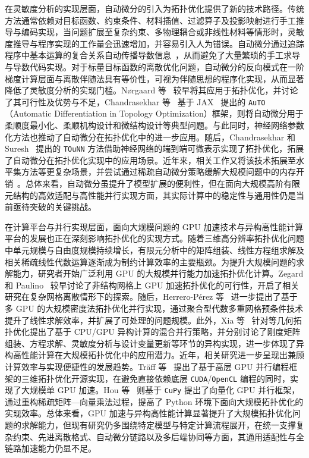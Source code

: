 在灵敏度分析的实现层面，自动微分的引入为拓扑优化提供了新的技术路径。传统方法通常依赖对目标函数、约束条件、材料插值、过滤算子及投影映射进行手工推导与编码实现，当问题扩展至复杂约束、多物理耦合或非线性材料等情形时，灵敏度推导与程序实现的工作量会迅速增加，并容易引入人为错误。自动微分通过追踪程序中基本运算的复合关系自动传播导数信息~\cite{griewankEvaluatingDerivativesPrinciples2008}，从而避免了大量繁琐的手工求导与导数代码实现。对于标量目标函数的离散优化问题，自动微分的反向模式在一阶梯度计算层面与离散伴随法具有等价性，可视为伴随思想的程序化实现，从而显著降低了灵敏度分析的实现门槛。Nørgaard 等~\cite{norgaardApplicationsAutomaticDifferentiation2017c} 较早将其应用于拓扑优化，并讨论了其可行性及优势与不足，Chandrasekhar 等~\cite{chandrasekharAuTOFrameworkAutomatic2021a} 基于 JAX~\cite{jax2018github} 提出的 \texttt{AuTO}（Automatic Differentiation in Topology Optimization）框架，则将自动微分用于柔顺度最小化、柔顺机构设计和微结构设计等典型问题。与此同时，神经网络参数化方法也推动了自动微分在拓扑优化中的进一步应用。随后，Chandrasekhar 和 Suresh~\cite{chandrasekharTOuNNTopologyOptimization2021a} 提出的 \texttt{TOuNN} 方法借助神经网络的端到端可微表示实现了拓扑优化，拓展了自动微分在拓扑优化实现中的应用场景。近年来，相关工作又将该技术拓展至水平集方法等更复杂场景，并尝试通过稀疏自动微分策略缓解大规模问题中的内存开销~\cite{neofytouLevelSetTopology2024a}。总体来看，自动微分虽提升了模型扩展的便利性，但在面向大规模高阶有限元结构的高效适配与高性能并行实现方面，其实际计算中的稳定性与通用性仍是当前亟待突破的关键挑战。

在计算平台与并行实现层面，面向大规模问题的 GPU 加速技术与异构高性能计算平台的发展也正在深刻影响拓扑优化的实现方式。随着三维高分辨率拓扑优化问题中单元规模与自由度规模持续增长，有限元分析中的矩阵组装、线性方程组求解及相关稀疏线性代数运算逐渐成为制约计算效率的主要瓶颈。为提升大规模问题的求解能力，研究者开始广泛利用 GPU 的大规模并行能力加速拓扑优化计算。Zegard 和 Paulino~\cite{zegardGPUAcceleratedTopology2013} 较早讨论了非结构网格上 GPU 加速拓扑优化的可行性，开启了相关研究在复杂网格离散情形下的探索。随后，Herrero-Pérez 等~\cite{herrero-perezMultiGPUAccelerationLargescale2021a} 进一步提出了基于多 GPU 的大规模密度法拓扑优化并行实现，通过聚合型代数多重网格预条件技术提升了线性求解效率，并扩展了可处理的问题规模。此外，Xia 等~\cite{xiaHybridParallelStrategy2024} 针对等几何拓扑优化提出了基于 CPU/GPU 异构计算的混合并行策略，并分别讨论了刚度矩阵组装、方程求解、灵敏度分析与设计变量更新等环节的异构实现，进一步体现了异构高性能计算在大规模拓扑优化中的应用潜力。近年，相关研究进一步呈现出兼顾计算效率与实现便捷性的发展趋势。Träff 等~\cite{traffSimpleEfficientGPU2023a} 提出了基于高层 GPU 并行编程框架的三维拓扑优化开源实现，在避免直接依赖底层 \texttt{CUDA}/\texttt{OpenCL} 编程的同时，实现了大规模单 GPU 加速。Hou 等~\cite{houParallelComputingGPU2025a} 则基于 \texttt{CuPy} 提出了向量化 GPU 并行框架，通过重构稀疏矩阵—向量乘法过程，提高了 Python 环境下面向大规模拓扑优化的实现效率。总体来看，GPU 加速与异构高性能计算显著提升了大规模拓扑优化问题的求解能力，但现有研究仍多围绕特定模型与特定计算流程展开，在统一支撑复杂约束、先进离散格式、自动微分链路以及多后端协同等方面，其通用适配性与全链路加速能力仍显不足。


